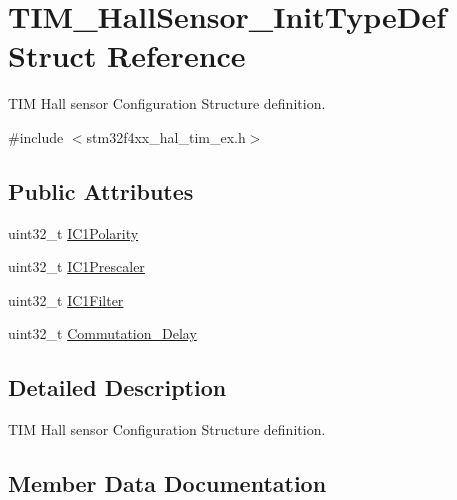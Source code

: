 \hypertarget{struct_t_i_m___hall_sensor___init_type_def}{}\section{T\+I\+M\+\_\+\+Hall\+Sensor\+\_\+\+Init\+Type\+Def Struct Reference}
\label{struct_t_i_m___hall_sensor___init_type_def}


T\+IM Hall sensor Configuration Structure definition.  




{\ttfamily \#include $<$stm32f4xx\+\_\+hal\+\_\+tim\+\_\+ex.\+h$>$}

\subsection*{Public Attributes}
\begin{DoxyCompactItemize}
\item 
uint32\+\_\+t \hyperlink{struct_t_i_m___hall_sensor___init_type_def_a08e8f098cb51159344135bab57d82d85}{I\+C1\+Polarity}
\item 
uint32\+\_\+t \hyperlink{struct_t_i_m___hall_sensor___init_type_def_ac6c54e891cbe5afec92676219978209e}{I\+C1\+Prescaler}
\item 
uint32\+\_\+t \hyperlink{struct_t_i_m___hall_sensor___init_type_def_a2d349ca17282be59dd09dc9b10948d24}{I\+C1\+Filter}
\item 
uint32\+\_\+t \hyperlink{struct_t_i_m___hall_sensor___init_type_def_a822efefca8a13af284e84070bd19bb91}{Commutation\+\_\+\+Delay}
\end{DoxyCompactItemize}


\subsection{Detailed Description}
T\+IM Hall sensor Configuration Structure definition. 

\subsection{Member Data Documentation}
